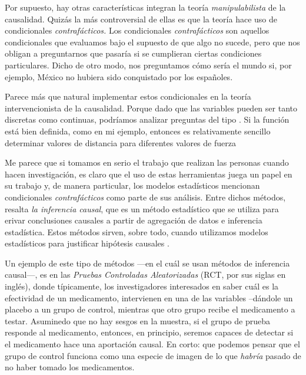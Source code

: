 Por supuesto, hay otras características integran la teoría \emph
{manipulabilista} de la causalidad. Quizás la más controversial de
ellas es que la teoría hace uso de condicionales
\emph{contrafácticos.} Los condicionales \emph{contrafácticos} son
aquellos condicionales que evaluamos bajo el supuesto de que algo no
sucede, pero que nos obligan a preguntarnos que pasaría si se
cumplieran ciertas condiciones particulares.
Dicho de otro modo, nos preguntamos cómo sería el mundo si, por
ejemplo, México no hubiera sido conquistado por los españoles.

Parece más que natural implementar estos condicionales en la teoría
intervencionista de la causalidad. Porque dado que las variables
pueden ser tanto discretas como continuas, podríamos analizar
preguntas del tipo . Si la función está bien definida,
como en mi ejemplo, entonces es relativamente sencillo determinar
valores de distancia para diferentes valores de fuerza

Me parece que si tomamos en serio el trabajo que realizan las
personas cuando hacen investigación, es claro que el uso de estas
herramientas juega un papel en su trabajo y, de manera particular,
los modelos estadísticos mencionan condicionales
\emph{contrafácticos} como parte de sus análisis. Entre dichos
métodos, resalta \emph{la inferencia causal}, que es un método
estadístico que se utiliza para erivar conclusiones causales a
partir de agregación de datos e inferencia estadística. Estos
métodos sirven, sobre todo, cuando utilizamos modelos estadísticos
para justificar hipótesis causales \parencite{Pearl2016, Pearl2018}.

Un ejemplo de este tipo de métodos ---en el cuál se usan
métodos de inferencia causal---, es en las \emph{Pruebas Controladas
	Aleatorizadas} (RCT, por sus siglas en inglés), donde típicamente,
los investigadores interesados en saber cuál es la efectividad de un
medicamento, intervienen en una de las variables --dándole un
placebo a un grupo de control, mientras que otro grupo recibe el
medicamento a testar. Asuminedo que no hay sesgos en la muestra, si
el grupo de prueba responde al medicamento, entonces, en principio,
seremos capaces de detectar si el medicamento hace una aportación
causal. En corto: que podemos pensar que el grupo de control
funciona como una especie de imagen de lo que \emph{habría} pasado
de no haber tomado los medicamentos.

